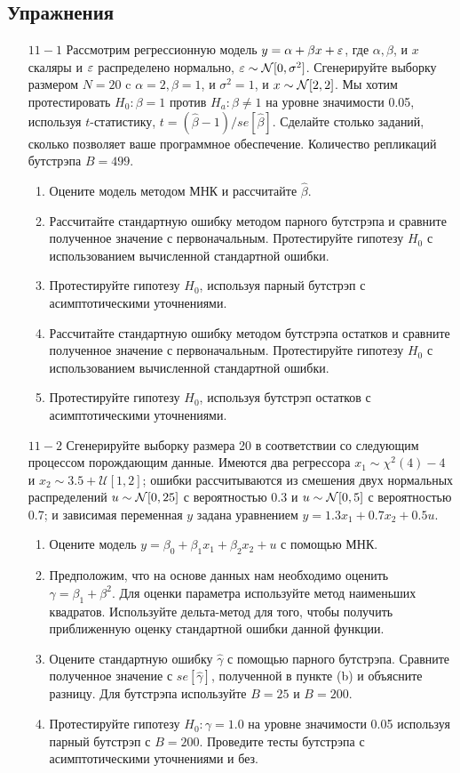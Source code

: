 \subsection{Упражнения}

\begin{enumerate}
\item [$11 - 1$] Рассмотрим регрессионную модель $y=\alpha+\beta x+\varepsilon$, где $\alpha, \beta$, и $x$ скаляры и $\varepsilon$ распределено нормально, $\varepsilon \sim \mathcal{N}[0,\sigma^2]$. Сгенерируйте выборку размером $N=20$ c $\alpha=2, \beta=1$, и $\sigma^2=1$, и $x \sim \mathcal{N}[2,2]$. Мы хотим протестировать $H_0:\beta=1$ против $H_a:\beta \neq 1$ на уровне значимости 0.05, используя $t$-статистику, $t=(\hat{\beta}-1)/se[\hat{\beta}]$. Сделайте столько заданий, сколько позволяет ваше программное обеспечение. Количество репликаций бутстрэпа $B=499$.
\begin{enumerate}
\item Оцените модель методом МНК и рассчитайте $\hat{\beta}$.
\item Рассчитайте стандартную ошибку методом парного бутстрэпа и сравните полученное значение с первоначальным. Протестируйте гипотезу $H_0$ с использованием вычисленной стандартной ошибки.\item  Протестируйте гипотезу $H_0$, используя парный бутстрэп с асимптотическими уточнениями.
\item Рассчитайте стандартную ошибку методом бутстрэпа остатков и сравните полученное значение с первоначальным. Протестируйте гипотезу $H_0$ с использованием вычисленной стандартной ошибки.
\item Протестируйте гипотезу $H_0$, используя  бутстрэп остатков с асимптотическими уточнениями.
\end{enumerate}

\item [$11 - 2$] Сгенерируйте выборку размера 20 в соответствии со следующим процессом порождающим данные. Имеются два регрессора $x_1\sim \chi^2(4)-4$ и $x_2 \sim 3.5+\mathcal{U}[1,2]$; ошибки рассчитываются из смешения двух нормальных распределений $u\sim \mathcal{N}[0,25]$ с вероятностью 0.3 и $u \sim \mathcal{N}[0,5]$ с вероятностью 0.7; и зависимая переменная $y$ задана уравнением $y=1.3x_1+0.7x_2+0.5u$.
\begin{enumerate}
\item Оцените модель $y=\beta_0+\beta_1{x_1}+\beta_2{x_2}+u$ с помощью МНК.
\item Предположим, что на основе данных нам необходимо оценить $\gamma=\beta_1+\beta^2$. Для оценки параметра используйте метод наименьших квадратов. Используйте дельта-метод для того, чтобы получить приближенную оценку стандартной ошибки данной функции.
\item Оцените стандартную ошибку $\hat{\gamma}$ с помощью парного бутстрэпа. Сравните полученное значение с $se[\hat{\gamma}]$, полученной в пункте (b) и объясните разницу. Для бутстрэпа используйте $B=25$ и $B=200$. 
\item Протестируйте гипотезу $H_0: \gamma=1.0$ на уровне значимости 0.05 используя парный бутстрэп с $B=200$. Проведите тесты бутстрэпа с асимптотическими уточнениями и без.
\end{enumerate}


\end{enumerate}
